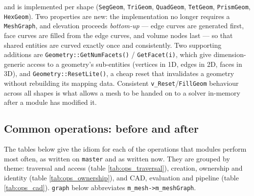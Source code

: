 \noindent and is implemented per shape (\texttt{SegGeom},
\texttt{TriGeom}, \texttt{QuadGeom}, \texttt{TetGeom},
\texttt{PrismGeom}, \texttt{HexGeom}). Two properties are new: the
implementation no longer requires a \texttt{MeshGraph}, and elevation
proceeds \textit{bottom-up} --- edge curves are generated first, face
curves are filled from the edge curves, and volume nodes last --- so
that shared entities are curved exactly once and consistently. Two
supporting additions are \texttt{Geometry::GetNumFacets()} /
\texttt{GetFacet(i)}, which give dimension-generic access to a
geometry's sub-entities (vertices in 1D, edges in 2D, faces in 3D),
and \texttt{Geometry::ResetLite()}, a cheap reset that invalidates a
geometry without rebuilding its mapping data. Consistent
\texttt{v\_Reset}/\texttt{FillGeom} behaviour across all shapes is
what allows a mesh to be handed on to a solver in-memory after a
module has modified it.

\subsection{Common operations: before and after}
\label{sect:common_ops}
The tables below give the idiom for each of the operations that
modules perform most often, as written on \texttt{master} and as
written now. They are grouped by theme: traversal and access
(table \ref{tab:ops_traversal}), creation, ownership and identity
(table \ref{tab:ops_ownership}), and CAD, evaluation and pipeline
(table \ref{tab:ops_cad}). \texttt{graph} below abbreviates
\texttt{m\_mesh->m\_meshGraph}.

